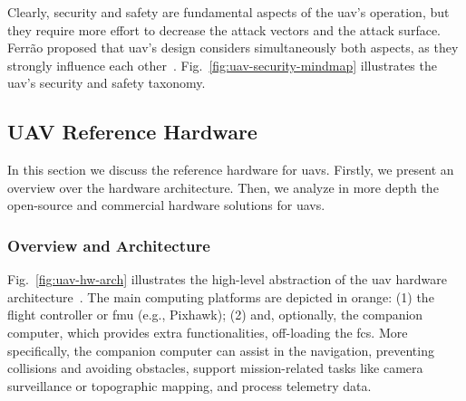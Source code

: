 Clearly, security and safety are fundamental aspects of the \gls{uav}'s
operation, but they require more effort to decrease the attack vectors and the
attack surface. Ferrão proposed that \gls{uav}'s design considers simultaneously
both aspects, as they strongly influence each
other~\cite{ferrao2020stuart}. Fig.~\ref{fig:uav-security-mindmap} illustrates the
\gls{uav}'s security and safety taxonomy.

\subsection{UAV Reference Hardware}%
\label{sec:uav-ref-hw}
In this section we discuss the reference hardware for \glspl{uav}.
Firstly, we present an overview over the hardware architecture. Then, we analyze
in more depth the open-source and commercial hardware solutions for \glspl{uav}.

\subsubsection{Overview and Architecture}%
\label{sec:overv-arch-hw}
Fig.~\ref{fig:uav-hw-arch} illustrates the high-level abstraction of the
\gls{uav} hardware architecture~\cite{leccadito2018survey,px4-sysArch}. The main
computing platforms are depicted in orange: (1) the flight controller or
\gls{fmu} (e.g., Pixhawk); (2) and, optionally,
the companion computer, which provides extra functionalities, off-loading the \gls{fcs}. More specifically, the companion computer can assist in the
navigation, preventing collisions and avoiding obstacles, support
mission-related tasks like camera surveillance or topographic mapping, and
process telemetry data.

